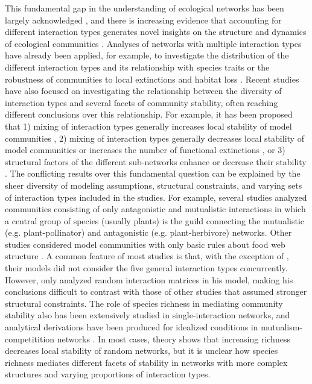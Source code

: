 This fundamental gap in the understanding of ecological networks has been largely acknowledged \citep{Strauss2004, Agrawal2007, Ings2009, Fontaine2011}, and there is increasing evidence that accounting for different interaction types generates novel insights on the structure and dynamics of ecological communities \citep{Pilosof2017, Garcia-Callejas2018}.  Analyses of networks with multiple interaction types have already been applied, for example, to investigate the distribution of the different interaction types and its relationship with species traits \citep{Kefi2015,Kefi2016a} or the robustness of communities to local extinctions and habitat loss \citep{Pocock2012,Evans2013a}. Recent studies have also focused on investigating the relationship between the diversity of interaction types and several facets of community stability, often reaching different conclusions over this relationship. For example, it has been proposed that 1) mixing of interaction types generally increases local stability of model communities \citep{Mougi2012,Mougi2014,Kondoh2015}, 2) mixing of interaction types generally decreases local stability of model communities or increases the number of functional extinctions \citep{Suweis2014,Sellman2016}, or 3) structural factors of the different sub-networks enhance or decrease their stability \citep{Melian2009,Sauve2014,Sauve2016}. The conflicting results over this fundamental question can be explained by the sheer diversity of modeling assumptions, structural constraints, and varying sets of interaction types included in the studies. For example, several studies \citep{Melian2009,Sauve2014,Sauve2016} analyzed communities consisting of only antagonistic and mutualistic interactions in which a central group of species (usually plants) is the guild connecting the mutualistic (e.g. plant-pollinator) and antagonistic (e.g. plant-herbivore) networks. Other studies considered model communities with only basic rules about food web structure \citep{Mougi2012,Suweis2014}. A common feature of most studies is that, with the exception of \cite{Mougi2016a}, their models did not consider the five general interaction types concurrently. However, \cite{Mougi2016a} only analyzed random interaction matrices in his model, making his conclusions difficult to contrast with those of other studies that assumed stronger structural constraints. The role of species richness in mediating community stability also has been extensively studied in single-interaction networks, and analytical derivations have been produced for idealized conditions in mutualism-competitition networks \citep{Allesina2012}. In most cases, theory shows that increasing richness decreases local stability of random networks, but it is unclear how species richness mediates different facets of stability in networks with more complex structures and varying proportions of interaction types.

